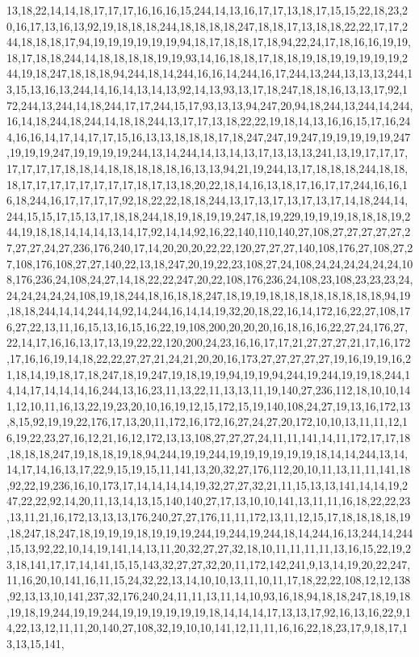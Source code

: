 13,18,22,14,14,18,17,17,17,16,16,16,15,244,14,13,16,17,17,13,18,17,15,15,22,18,23,20,16,17,13,16,13,92,19,18,18,18,244,18,18,18,18,247,18,18,17,13,18,18,22,22,17,17,244,18,18,18,17,94,19,19,19,19,19,19,94,18,17,18,18,17,18,94,22,24,17,18,16,16,19,19,18,17,18,18,244,14,18,18,18,18,19,19,93,14,16,18,18,17,18,18,19,18,19,19,19,19,19,244,19,18,247,18,18,18,94,244,18,14,244,16,16,14,244,16,17,244,13,244,13,13,13,244,13,15,13,16,13,244,14,16,14,13,14,13,92,14,13,93,13,17,18,247,18,18,16,13,13,17,92,172,244,13,244,14,18,244,17,17,244,15,17,93,13,13,94,247,20,94,18,244,13,244,14,244,16,14,18,244,18,244,14,18,18,244,13,17,17,13,18,22,22,19,18,14,13,16,16,15,17,16,244,16,16,14,17,14,17,17,15,16,13,13,18,18,18,17,18,247,247,19,247,19,19,19,19,19,247,19,19,19,247,19,19,19,19,244,13,14,244,14,13,14,13,17,13,13,13,241,13,19,17,17,17,17,17,17,17,18,18,14,18,18,18,18,18,16,13,13,94,21,19,244,13,17,18,18,18,244,18,18,18,17,17,17,17,17,17,17,17,18,17,13,18,20,22,18,14,16,13,18,17,16,17,17,244,16,16,16,18,244,16,17,17,17,17,92,18,22,22,18,18,244,13,17,13,17,13,17,13,17,14,18,244,14,244,15,15,17,15,13,17,18,18,244,18,19,18,19,19,247,18,19,229,19,19,19,18,18,18,19,244,19,18,18,14,14,14,13,14,17,92,14,14,92,16,22,140,110,140,27,108,27,27,27,27,27,27,27,27,24,27,236,176,240,17,14,20,20,20,22,22,120,27,27,27,140,108,176,27,108,27,27,108,176,108,27,27,140,22,13,18,247,20,19,22,23,108,27,24,108,24,24,24,24,24,24,108,176,236,24,108,24,27,14,18,22,22,247,20,22,108,176,236,24,108,23,108,23,23,23,24,24,24,24,24,24,108,19,18,244,18,16,18,18,247,18,19,19,18,18,18,18,18,18,18,18,94,19,18,18,244,14,14,244,14,92,14,244,16,14,14,19,32,20,18,22,16,14,172,16,22,27,108,176,27,22,13,11,16,15,13,16,15,16,22,19,108,200,20,20,20,16,18,16,16,22,27,24,176,27,22,14,17,16,16,13,17,13,19,22,22,120,200,24,23,16,16,17,17,21,27,27,27,21,17,16,172,17,16,16,19,14,18,22,22,27,27,21,24,21,20,20,16,173,27,27,27,27,27,19,16,19,19,16,21,18,14,19,18,17,18,247,18,19,247,19,18,19,19,94,19,19,94,244,19,244,19,19,18,244,14,14,17,14,14,14,16,244,13,16,23,11,13,22,11,13,13,11,19,140,27,236,112,18,10,10,141,12,10,11,16,13,22,19,23,20,10,16,19,12,15,172,15,19,140,108,24,27,19,13,16,172,13,8,15,92,19,19,22,176,17,13,20,11,172,16,172,16,27,24,27,20,172,10,10,13,11,11,12,16,19,22,23,27,16,12,21,16,12,172,13,13,108,27,27,27,24,11,11,141,14,11,172,17,17,18,18,18,18,247,19,18,18,19,18,94,244,19,19,244,19,19,19,19,19,19,18,14,14,244,13,14,14,17,14,16,13,17,22,9,15,19,15,11,141,13,20,32,27,176,112,20,10,11,13,11,11,141,18,92,22,19,236,16,10,173,17,14,14,14,14,19,32,27,27,32,21,11,15,13,13,141,14,14,19,247,22,22,92,14,20,11,13,14,13,15,140,140,27,17,13,10,10,141,13,11,11,16,18,22,22,23,13,11,21,16,172,13,13,13,176,240,27,27,176,11,11,172,13,11,12,15,17,18,18,18,18,19,18,247,18,247,18,19,19,19,18,19,19,19,244,19,244,19,244,18,14,244,16,13,244,14,244,15,13,92,22,10,14,19,141,14,13,11,20,32,27,27,32,18,10,11,11,11,11,13,16,15,22,19,23,18,141,17,17,14,141,15,15,143,32,27,27,32,20,11,172,142,241,9,13,14,19,20,22,247,11,16,20,10,141,16,11,15,24,32,22,13,14,10,10,13,11,10,11,17,18,22,22,108,12,12,138,92,13,13,10,141,237,32,176,240,24,11,11,13,11,14,10,93,16,18,94,18,18,247,18,19,18,19,18,19,244,19,19,244,19,19,19,19,19,19,18,14,14,14,17,13,13,17,92,16,13,16,22,9,14,22,13,12,11,11,20,140,27,108,32,19,10,10,141,12,11,11,16,16,22,18,23,17,9,18,17,13,13,15,141,